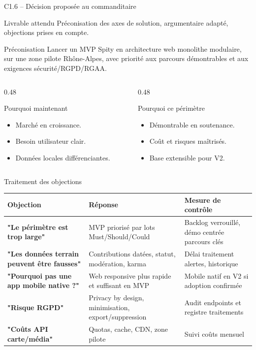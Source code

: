 \documentclass[aspectratio=169,11pt]{beamer}
\newcommand{\competence}[2]{%
  \begin{block}{#1}
    #2
  \end{block}
}
\begin{document}
\begin{frame}{C1.6 -- Décision proposée au commanditaire}
  \competence{Livrable attendu}{Préconisation des axes de solution, argumentaire adapté, objections prises en compte.}
  \begin{block}{Préconisation}
    Lancer un MVP Spity en architecture web monolithe modulaire, sur une zone pilote Rhône-Alpes, avec priorité aux parcours démontrables et aux exigences sécurité/RGPD/RGAA.
  \end{block}
  \begin{columns}[T]
    \begin{column}{0.48\textwidth}
      \begin{block}{Pourquoi maintenant}
        \begin{itemize}
          \item Marché en croissance.
          \item Besoin utilisateur clair.
          \item Données locales différenciantes.
        \end{itemize}
      \end{block}
    \end{column}
    \begin{column}{0.48\textwidth}
      \begin{block}{Pourquoi ce périmètre}
        \begin{itemize}
          \item Démontrable en soutenance.
          \item Coût et risques maîtrisés.
          \item Base extensible pour V2.
        \end{itemize}
      \end{block}
    \end{column}
  \end{columns}
\end{frame}

\begin{frame}{Traitement des objections}
  \small
  \begin{tabularx}{\textwidth}{>{\bfseries}p{3.5cm} X X}
    Objection & Réponse & Mesure de contrôle \\
    \hline
    "Le périmètre est trop large" & MVP priorisé par lots Must/Should/Could & Backlog verrouillé, démo centrée parcours clés \\
    "Les données terrain peuvent être fausses" & Contributions datées, statut, modération, karma & Délai traitement alertes, historique \\
    "Pourquoi pas une app mobile native ?" & Web responsive plus rapide et suffisant en MVP & Mobile natif en V2 si adoption confirmée \\
    "Risque RGPD" & Privacy by design, minimisation, export/suppression & Audit endpoints et registre traitements \\
    "Coûts API carte/média" & Quotas, cache, CDN, zone pilote & Suivi coûts mensuel \\
  \end{tabularx}
\end{frame}
\end{document}
